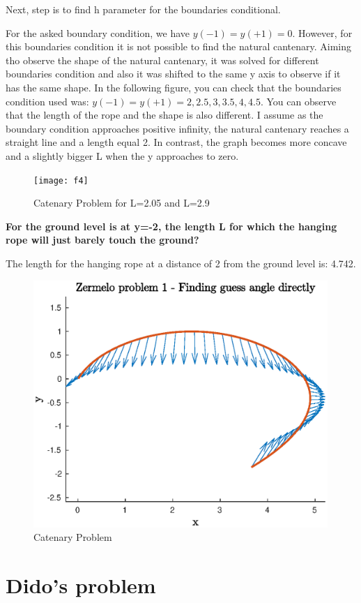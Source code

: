 \documentclass{article}
\begin{document}
Next, step is to find h parameter for the boundaries conditional. 

For the asked boundary condition, we have $y(-1)=y(+1)=0$. However, for this boundaries condition it is not possible to find the natural cantenary. Aiming tho observe the shape of the natural cantenary, it was solved for different boundaries condition and also it was shifted to the same y axis to observe if it has the same shape. In the following figure, you can check that the boundaries condition used was: $y(-1)=y(+1)=2,2.5,3,3.5,4,4.5$. You can observe that the length of the rope and the shape is also different. I assume as the boundary condition approaches positive infinity, the natural cantenary reaches a straight line and a length equal 2. In contrast, the graph becomes more concave and a slightly bigger L when the y approaches to zero.

\begin{figure}[H]
\centering
\texttt{[image: f4]}
\caption{Catenary Problem for L=2.05 and L=2.9}
\end{figure}


\textbf{For the ground level is at y=-2, the length L for which the hanging rope will just barely touch the ground?}

The length for the hanging rope at a distance of 2 from the ground level is: 4.742.

\begin{figure}[H]
\centering
\includegraphics [width=4.4in]{f2}
\caption{Catenary Problem}
\end{figure}


\section{Dido's problem}
\end{document}
